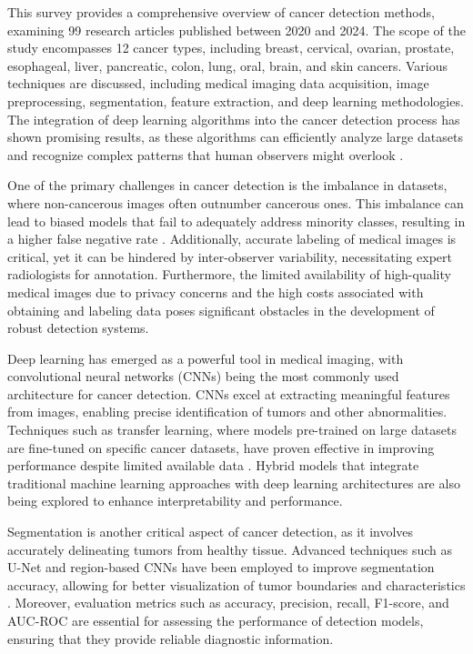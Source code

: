 \documentclass[runningheads]{llncs}
\begin{document}
This survey provides a comprehensive overview of cancer detection methods, examining 99 research articles published between 2020 and 2024. The scope of the study encompasses 12 cancer types, including breast, cervical, ovarian, prostate, esophageal, liver, pancreatic, colon, lung, oral, brain, and skin cancers. Various techniques are discussed, including medical imaging data acquisition, image preprocessing, segmentation, feature extraction, and deep learning methodologies. The integration of deep learning algorithms into the cancer detection process has shown promising results, as these algorithms can efficiently analyze large datasets and recognize complex patterns that human observers might overlook \cite{Istiak_2024}.

One of the primary challenges in cancer detection is the imbalance in datasets, where non-cancerous images often outnumber cancerous ones. This imbalance can lead to biased models that fail to adequately address minority classes, resulting in a higher false negative rate \cite{Istiak_2024}. Additionally, accurate labeling of medical images is critical, yet it can be hindered by inter-observer variability, necessitating expert radiologists for annotation. Furthermore, the limited availability of high-quality medical images due to privacy concerns and the high costs associated with obtaining and labeling data poses significant obstacles in the development of robust detection systems.

Deep learning has emerged as a powerful tool in medical imaging, with convolutional neural networks (CNNs) being the most commonly used architecture for cancer detection. CNNs excel at extracting meaningful features from images, enabling precise identification of tumors and other abnormalities. Techniques such as transfer learning, where models pre-trained on large datasets are fine-tuned on specific cancer datasets, have proven effective in improving performance despite limited available data \cite{Istiak_2024}. Hybrid models that integrate traditional machine learning approaches with deep learning architectures are also being explored to enhance interpretability and performance.

Segmentation is another critical aspect of cancer detection, as it involves accurately delineating tumors from healthy tissue. Advanced techniques such as U-Net and region-based CNNs have been employed to improve segmentation accuracy, allowing for better visualization of tumor boundaries and characteristics \cite{Istiak_2024}. Moreover, evaluation metrics such as accuracy, precision, recall, F1-score, and AUC-ROC are essential for assessing the performance of detection models, ensuring that they provide reliable diagnostic information.
\end{document}
